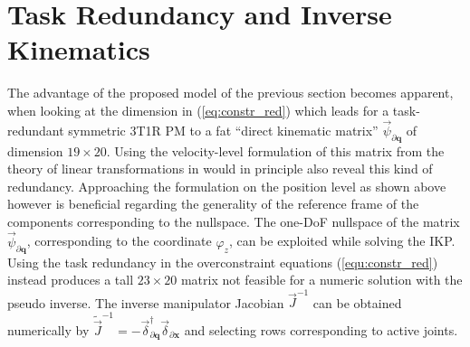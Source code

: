 \documentclass[
	graybox,
	vecphys] %
	{svmult}
\newcommand{\bm}[1]{\boldsymbol{#1}}
\newcommand{\Res}[0]{\vec{\delta}}
\newcommand{\vecResR}[0]{\vec{\psi}}
\begin{document}


%



\section{Task Redundancy and Inverse Kinematics}
\label{sec:taskred}

The advantage of the proposed model of the previous section becomes apparent, when looking at the dimension in (\ref{eq:constr_red}) which leads for a task-redundant symmetric 3T1R PM to a fat ``direct kinematic matrix'' \cite{Gogu2008} $\vecResR_{\partial \bm{q}}$ of dimension $19 {\times} 20$.
Using the velocity-level formulation of this matrix from the theory of linear transformations in \cite{Gogu2008} would in principle also reveal this kind of redundancy.
Approaching the formulation on the position level as shown above however is beneficial regarding the generality of the reference frame of the components corresponding to the nullspace.
The one-DoF nullspace of the matrix $\vecResR_{\partial \bm{q}}$, corresponding to  %
the coordinate $\varphi_z$, can be exploited while solving the IKP.
Using the task redundancy in the overconstraint equations (\ref{equ:constr_red}) instead produces a tall $23 {\times} 20$ matrix not feasible for a numeric solution with the pseudo inverse.
The inverse manipulator Jacobian $\vec{J}^{-1}$ can be obtained numerically by $\tilde{\vec{J}}^{-1}{=}{-} \Res_{\partial \bm{q}}^{\dagger} \Res_{\partial \bm{x}}$  and selecting rows corresponding to active joints. %
\end{document}

